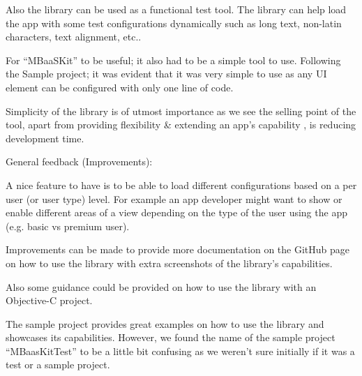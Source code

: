 Also the library can be used as a functional test tool. The library can help load the app with some test configurations dynamically such as long text, non-latin characters, text alignment, etc..

For “MBaaSKit” to be useful; it also had to be a simple tool to use. Following the Sample project; it was evident that it was very simple to use as any UI element can be configured with only one line of code. 

Simplicity of the library is of utmost importance as we see the selling point of the tool, apart from providing flexibility & extending an app’s capability , is reducing development time.

General feedback (Improvements):

A nice feature to have is to be able to load different configurations based on a per user (or user type) level. For example an app developer might want to show or enable different areas of a view depending on the type of the user using the app (e.g. basic vs premium user). 

Improvements can be made to provide more documentation on the GitHub page on how to use the library with extra screenshots of the library’s capabilities. 

Also some guidance could be provided on how to use the library with an Objective-C project.

The sample project provides great examples on how to use the library and showcases its capabilities. However, we found the name of the sample project “MBaasKitTest” to be a little bit confusing as we weren’t sure initially if it was a test or a sample project.
